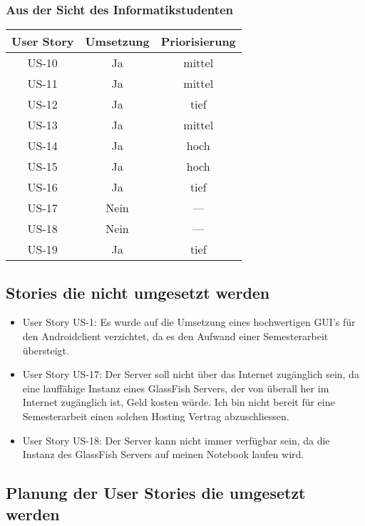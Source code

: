 \documentclass[listof=totocnumbered, bibliography=totocnumbered]{scrreprt}
\begin{document}
  \subsubsection{Aus der Sicht des Informatikstudenten}
  
  \begin{tabular}{ccc}
    \toprule
    User Story & Umsetzung & Priorisierung \\
    \midrule
    US-10 & Ja & mittel \\
    US-11 & Ja & mittel \\
    US-12 & Ja & tief \\
    US-13 & Ja & mittel \\
    US-14 & Ja & hoch \\
    US-15 & Ja & hoch \\
    US-16 & Ja & tief \\
    US-17 & Nein & --- \\
    US-18 & Nein & --- \\
    US-19 & Ja & tief \\
    \bottomrule
  \end{tabular}
  
  \subsection{Stories die nicht umgesetzt werden}
  
  \begin{itemize}
    \item User Story US-1: Es wurde auf die Umsetzung eines hochwertigen
    \ac{GUI}'s für den Androidclient verzichtet, da es den Aufwand einer
    Semesterarbeit übersteigt.
    \item User Story US-17: Der Server soll nicht über das Internet zugänglich
    sein, da eine lauffähige Instanz eines GlassFish Servers, der von überall
    her im Internet zugänglich ist, Geld kosten würde. Ich bin nicht bereit für
    eine Semesterarbeit einen solchen Hosting Vertrag abzuschliessen.
    \item User Story US-18: Der Server kann nicht immer verfügbar sein, da die
    Instanz des GlassFish Servers auf meinen Notebook laufen wird.
  \end{itemize}
  
  \subsection{Planung der User Stories die umgesetzt werden}
  
\end{document}
